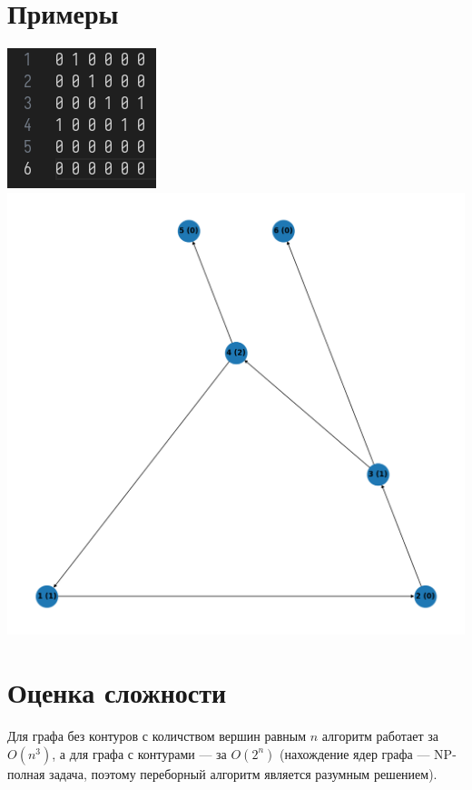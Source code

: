 \documentclass[12pt, letterpaper, titlepage]{article}
\begin{document}
\section{Примеры}
\includegraphics[scale=0.7]{graphs/adj_matrix.png}
\includegraphics[scale=0.5]{graphs/grundy.png}
\section{Оценка сложности}
Для графа без контуров с количством вершин равным $n$ алгоритм работает за $O(n^3)$,
а для графа с контурами --- за $O(2^n)$ (нахождение ядер графа --- NP-полная задача, поэтому переборный алгоритм является разумным решением).
\end{document}
